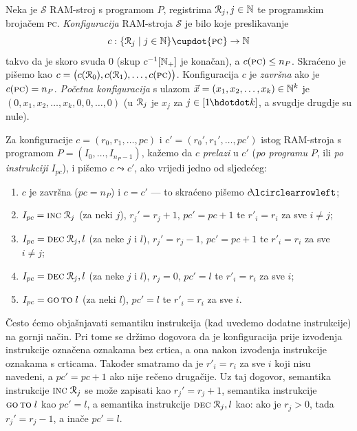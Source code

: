 \begin{definicija}[{name=[RAM-konfiguracije i prijelazi među njima]}]\label{def:RAMconf}
Neka je $\mathcal S$ RAM-stroj s programom $P$, registrima $\mathcal R_{j},j\in{\mathbb N}$ te programskim brojačem \textsc{pc}. \emph{Konfiguracija} RAM-stroja $\mathcal S$ je bilo koje preslikavanje
\begin{equation}
    c:\{\reg{j}\mid j\in\N\}\dcup\{\textsc{pc}\}\to\N
\end{equation} takvo da je skoro svuda $0$ (skup $c^{-1}[{\mathbb N}_+]$ je konačan), a $c(\textsc{pc})\le n_P$. Skraćeno je pišemo kao $c=\bigl(c(\mathcal R_{0}),c(\mathcal R_{1}),\dotsc,c(\textsc{pc})\bigr)$. Konfiguracija $c$ je \emph{završna} ako je $c(\textsc{pc})=n_P$. \emph{Početna konfiguracija} s ulazom $\vec x=(x_1,x_2,\dotsc,x_k)\in{\mathbb N}^k$ je $(0,x_1,x_2,\dotsc,x_k,0,0,\dotsc,0)$ (u $\mathcal R_{j}$ je $x_j$ za $j\in[1\mspace{-1mu}\dd k]$, a svugdje drugdje su nule).

    Za konfiguracije $c=(r_0,r_1,\dotsc,pc)$ i $c'=(r_0',r_1',\dotsc,pc')$ istog RAM-stroja s programom $P=(I_0,\dotsc,I_{n_P-1})$, kažemo da $c$ \emph{prelazi} u $c'$ (\emph{po programu} $P$, ili \emph{po instrukciji} $I_{pc}$), i pišemo $c\leadsto c'$, ako vrijedi jedno od sljedećeg:
\begin{enumerate}
    \item\label{stav:leadzav}
    $c$ je završna ($pc=n_P$) i $c=c'$ --- to skraćeno pišemo $c\!\lcirclearrowleft$;
    \item\label{stav:leadINC}
    $I_{pc}=\textsc{inc}\;\mathcal R_{j}$ (za neki $j$), $r_j'=r_j+1$, $pc'=pc+1$ te $r'_i=r_i$ za sve $i\ne j$;
    \item\label{stav:leadDEC-}
    $I_{pc}=\textsc{dec}\;\mathcal R_{j},l$ (za neke $j$ i $l$),  $r_j'=r_j-1$, $pc'=pc+1$ te $r'_i=r_i$ za sve $i\ne j$;
    \item\label{stav:leadDEC0}
    $I_{pc}=\textsc{dec}\;\mathcal R_{j},l$ (za neke $j$ i $l$), $r_j=0$, $pc'=l$ te $r'_i=r_i$ za sve $i$;
    \item\label{stav:leadGOTO}
    $I_{pc}=\textsc{go\,to}\;l$ (za neki $l$), $pc'=l$ te $r'_i=r_i$ za sve $i$.\qedhere
\end{enumerate}
\end{definicija}

Često ćemo objašnjavati semantiku instrukcija (kad uvedemo dodatne instrukcije) na gornji način. Pri tome se držimo dogovora da je konfiguracija prije izvođenja instrukcije označena oznakama bez crtica, a ona nakon izvođenja instrukcije oznakama s crticama. Također smatramo da je $r'_i=r_i$ za sve $i$ koji nisu navedeni, a $pc'=pc+1$ ako nije rečeno drugačije. Uz taj dogovor, semantika instrukcije $\textsc{inc}\;\mathcal R_{j}$ se može zapisati kao $r_j'=r_j+1$, semantika instrukcije $\textsc{go\,to}\;l$ kao $pc'=l$, a semantika instrukcije $\textsc{dec}\;\mathcal R_{j},l$ kao: ako je $r_j>0$, tada $r_j'=r_j-1$, a inače $pc'=l$.

